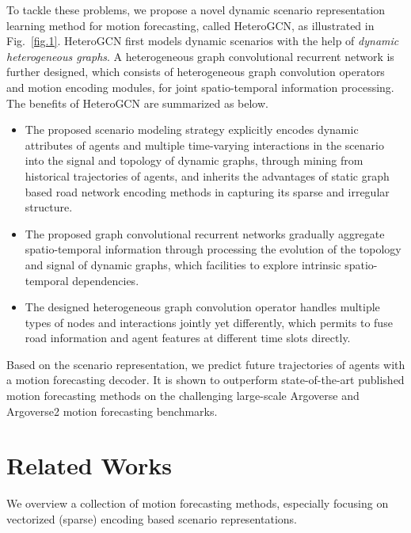 \documentclass[letterpaper, 10 pt, conference]{ieeeconf}
\begin{document}
To tackle these problems, we propose a novel dynamic scenario representation learning method for motion forecasting, called HeteroGCN, as illustrated in Fig.~\ref{fig.1}. 
HeteroGCN first models dynamic scenarios with the help of \textit{dynamic heterogeneous graphs}.
A heterogeneous graph convolutional recurrent network  is further designed, which consists of heterogeneous graph convolution operators and motion encoding modules, for joint spatio-temporal information processing. The benefits
of HeteroGCN are summarized as below.
\begin{itemize}
\item The proposed scenario modeling strategy explicitly encodes dynamic attributes of agents  and multiple time-varying interactions in the scenario into the signal and topology of dynamic graphs, through mining from historical trajectories of agents, and inherits the advantages of static graph based road network encoding methods in capturing its sparse and irregular structure.
\item The proposed graph convolutional recurrent networks gradually aggregate spatio-temporal information through processing the evolution of the topology and signal of dynamic graphs, which facilities to explore intrinsic spatio-temporal dependencies.
\item The designed heterogeneous graph convolution operator handles multiple types of nodes and interactions jointly yet differently, which permits to fuse road information and agent features at different time slots directly.
\end{itemize}
Based on the scenario representation, we predict future trajectories of agents with a motion forecasting decoder.
It is shown to outperform state-of-the-art published motion forecasting methods on the challenging large-scale Argoverse and Argoverse2 motion forecasting benchmarks. 

\section{Related Works}
We overview a collection of motion forecasting methods, especially focusing on vectorized (sparse) encoding based scenario representations.
\end{document}
